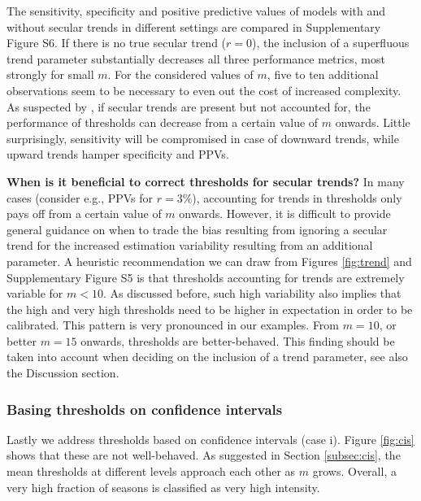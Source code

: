 \documentclass[12pt]{article}
\begin{document}
The sensitivity, specificity and positive predictive values of models with and without secular trends in different settings are compared in Supplementary Figure S6. If there is no true secular trend ($r = 0$), the inclusion of a superfluous trend parameter substantially decreases all three performance metrics, most strongly for small $m$. For the considered values of $m$, five to ten additional observations seem to be necessary to even out the cost of increased complexity. As suspected by \cite{Vega2013}, if secular trends are present but not accounted for, the performance of thresholds can decrease from a certain value of $m$ onwards. Little surprisingly, sensitivity will be compromised in case of downward trends, while upward trends hamper specificity and PPVs.

\noindent \textbf{When is it beneficial to correct thresholds for secular trends?} In many cases (consider e.g., PPVs for $r = 3\%$), accounting for trends in thresholds only pays off from a certain value of $m$ onwards. However, it is difficult to provide general guidance on when to trade the bias resulting from ignoring a secular trend for the increased estimation variability resulting from an additional parameter. A heuristic recommendation we can draw from Figures \ref{fig:trend} and Supplementary Figure S5 is that thresholds accounting for trends are extremely variable for $m < 10$. As discussed before, such high variability also implies that the high and very high thresholds need to be higher in expectation in order to be calibrated. This pattern is very pronounced in our examples. From $m = 10$, or better $m = 15$ onwards, thresholds are better-behaved. This finding should be taken into account when deciding on the inclusion of a trend parameter, see also the Discussion section.


\subsubsection{Basing thresholds on confidence intervals}

Lastly we address thresholds based on confidence intervals (case i). Figure \ref{fig:cis} shows that these are not well-behaved. As suggested in Section \ref{subsec:cis}, the mean thresholds at different levels approach each other as $m$ grows. Overall, a very high fraction of seasons is classified as very high intensity.
\end{document}
